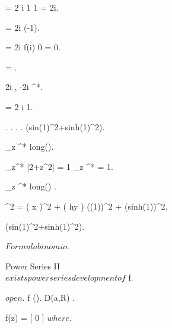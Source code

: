 \documentclass[../Main/main]{subfiles}
\begin{document}
{{{			 = 2 \pi i 1 1 = 2\pi i.

			 = 2\pi i  (-1).
			
			 = 2\pi i f(i) 0 = 0.

			 = .

			2i , -2i \nin \gamma^*.

			 = 2 \pi i  1. 
		}
	}


	{
		{
			.
			.
			.
		}
		\holds
		{
			 \leq \pi.
			 \pi(sin(1)^2+sinh(1)^2).
		}
		\demonstration
		{
			 \leq \sup_{z \in \gamma^*}  long(\gamma).

			\min_{z\in \gamma^*} |2+z^2| = 1 \imp \sup_{z \in \gamma^*} = 1.

			\sup_{z \in \gamma^*}  long(\gamma) \leq \pi.

			^2 = \sin( x )^2 + \sin( hy ) \leq (\sin(1))^2 + (sinh(1))^2.

			 \pi(sin(1)^2+sinh(1)^2).

			 $Formula binomio$.
		}
	}
	
	
	Power Series II\\

	{
		{
		}
		{
			$exists power series development of $ f.
		}
	}
	
	
	

	{
		{
			\Omega \subset \C $ open $.
			f \in \Hc(\C).
			D(a,R) \subset \Omega.
		}
		\holds
		{
			f(z) = [ 0 ] $ where $.

}}}
\end{document}
